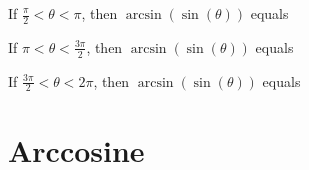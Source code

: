 \documentclass{ximera}
\begin{document}
\begin{question}


If $\frac{\pi}{2} < \theta < \pi$, then $\arcsin(\sin(\theta))$ equals

\begin{multipleChoice}
\choice {$\theta$}
\choice[correct] {$\pi - \theta$}
\choice {$\pi + \theta$}
\choice {$\theta - 2\pi$}
\end{multipleChoice}

\end{question}






\begin{question}


If $\pi < \theta < \frac{3\pi}{2}$, then $\arcsin(\sin(\theta))$ equals

\begin{multipleChoice}
\choice {$\theta$}
\choice[correct] {$\pi - \theta$}
\choice {$\pi + \theta$}
\choice {$\theta - 2\pi$}
\end{multipleChoice}

\end{question}






\begin{question}


If $\frac{3\pi}{2} < \theta < 2\pi$, then $\arcsin(\sin(\theta))$ equals

\begin{multipleChoice}
\choice {$\theta$}
\choice {$\pi - \theta$}
\choice {$\pi + \theta$}
\choice[correct] {$\theta - 2\pi$}
\end{multipleChoice}

\end{question}


























\section*{Arccosine}
\end{document}
